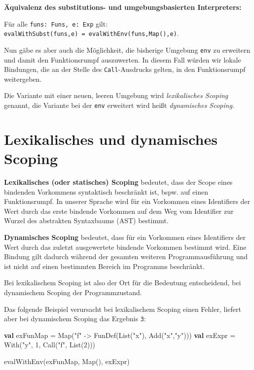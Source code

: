 \documentclass[]{article}
\newenvironment{Shaded}{}{}
\newcommand{\DecValTok}[1]{\textcolor[rgb]{0.25,0.63,0.44}{#1}}
\newcommand{\FunctionTok}[1]{\textcolor[rgb]{0.02,0.16,0.49}{#1}}
\newcommand{\KeywordTok}[1]{\textcolor[rgb]{0.00,0.44,0.13}{\textbf{#1}}}
\newcommand{\NormalTok}[1]{#1}
\newcommand{\StringTok}[1]{\textcolor[rgb]{0.25,0.44,0.63}{#1}}
\begin{document}
\textbf{Äquivalenz des substitutions- und umgebungsbasierten
Interpreters:}

Für alle \texttt{funs:\ Funs,\ e:\ Exp} gilt:
\texttt{evalWithSubst(funs,e)\ =\ evalWithEnv(funs,Map(),e)}.

Nun gäbe es aber auch die Möglichkeit, die bisherige Umgebung
\texttt{env} zu erweitern und damit den Funktionsrumpf auszuwerten. In
diesem Fall würden wir lokale Bindungen, die an der Stelle des
\texttt{Call}-Ausdrucks gelten, in den Funktionsrumpf weitergeben.

Die Variante mit einer neuen, leeren Umgebung wird \emph{lexikalisches
Scoping} genannt, die Variante bei der \texttt{env} erweitert wird heißt
\emph{dynamisches Scoping}.

\hypertarget{lexikalisches-und-dynamisches-scoping}{%
\section{Lexikalisches und dynamisches
Scoping}\label{lexikalisches-und-dynamisches-scoping}}

\textbf{Lexikalisches (oder statisches) Scoping} bedeutet, dass der
Scope eines bindenden Vorkommens syntaktisch beschränkt ist, bspw. auf
einen Funktionsrumpf. In unserer Sprache wird für ein Vorkommen eines
Identifiers der Wert durch das erste bindende Vorkommen auf dem Weg vom
Identifier zur Wurzel des abstrakten Syntaxbaums (AST) bestimmt.

\textbf{Dynamisches Scoping} bedeutet, dass für ein Vorkommen eines
Identifiers der Wert durch das zuletzt ausgewertete bindende Vorkommen
bestimmt wird. Eine Bindung gilt dadurch während der gesamten weiteren
Programmausführung und ist nicht auf einen bestimmten Bereich im
Programms beschränkt.

Bei lexikalischem Scoping ist also der Ort für die Bedeutung
entscheidend, bei dynamischem Scoping der Programmzustand.

Das folgende Beispiel verursacht bei lexikalischem Scoping einen Fehler,
liefert aber bei dynamischem Scoping das Ergebnis \texttt{3}:

\begin{Shaded}
\begin{Highlighting}[]
\KeywordTok{val}\NormalTok{ exFunMap = Map(}\StringTok{"f"}\NormalTok{ {-}\textgreater{} }\FunctionTok{FunDef}\NormalTok{(List(}\StringTok{"x"}\NormalTok{), }\FunctionTok{Add}\NormalTok{(}\StringTok{"x"}\NormalTok{,}\StringTok{"y"}\NormalTok{)))}
\KeywordTok{val}\NormalTok{ exExpr = }\FunctionTok{With}\NormalTok{(}\StringTok{"y"}\NormalTok{, }\DecValTok{1}\NormalTok{, }\FunctionTok{Call}\NormalTok{(}\StringTok{"f"}\NormalTok{, List(}\DecValTok{2}\NormalTok{)))}

\FunctionTok{evalWithEnv}\NormalTok{(exFunMap, Map(), exExpr)}
\end{Highlighting}
\end{Shaded}
\end{document}
